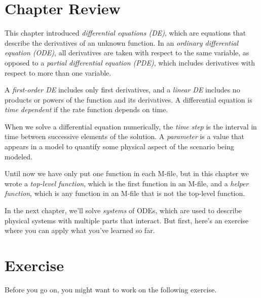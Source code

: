 
\section{Chapter Review}

This chapter introduced \emph{differential equations (DE)}, which are equations that describe the
derivatives of an unknown function.
In an \emph{ordinary differential equation (ODE)}, all derivatives are taken with
respect to the same variable, as opposed to a \emph{partial differential equation (PDE)}, which includes derivatives with respect to more than one variable.

A \emph{first-order DE} includes only first derivatives, and a \emph{linear DE} includes no products or powers of the function and its derivatives.
A differential equation is \emph{time dependent} if the rate function depends on time.

When we solve a differential equation numerically, the \emph{time step} is the interval in time between successive elements of the solution.
A \emph{parameter} is a value that appears in a model to quantify some
physical aspect of the scenario being modeled.

Until now we have only put one function in each M-file, but in this chapter we wrote a \emph{top-level function}, which is the first function in an M-file, and a \emph{helper function}, which is any function in an M-file that is not the top-level function.

In the next chapter, we'll solve \emph{systems} of ODEs, which are used to describe physical systems with multiple parts that interact.
But first, here's an exercise where you can apply what you've learned so far.


\section{Exercise}

Before you go on, you might want to work on the following exercise.


